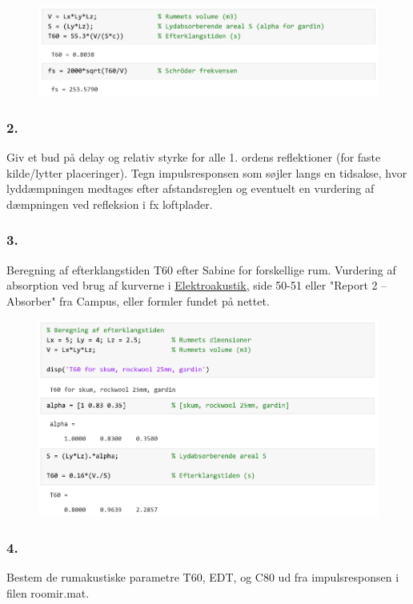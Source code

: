 \begin{figure} [H]
	\includegraphics[width=\linewidth]{graphics/34.png}
\end{figure}
\subsubsection{2.}
Giv et bud på delay og relativ styrke for alle 1. ordens reflektioner (for faste kilde/lytter placeringer). Tegn impulsresponsen som søjler langs en tidsakse, hvor lyddæmpningen medtages efter afstandsreglen og eventuelt en vurdering af dæmpningen ved refleksion i fx loftplader.
\subsubsection{3.}
Beregning af efterklangstiden T60 efter Sabine for forskellige rum. Vurdering af absorption ved brug af kurverne i \href{http://www.torean.dk/artikel/Elektroakustik.pdf}{Elektroakustik,} side 50-51 eller "Report 2 – Absorber" fra Campus, eller formler fundet på nettet.
\begin{figure} [H]
	\includegraphics[width=\linewidth]{graphics/35.png}
\end{figure}

\subsubsection{4.}
Bestem de rumakustiske parametre T60, EDT, og C80 ud fra impulsresponsen i filen roomir.mat.


